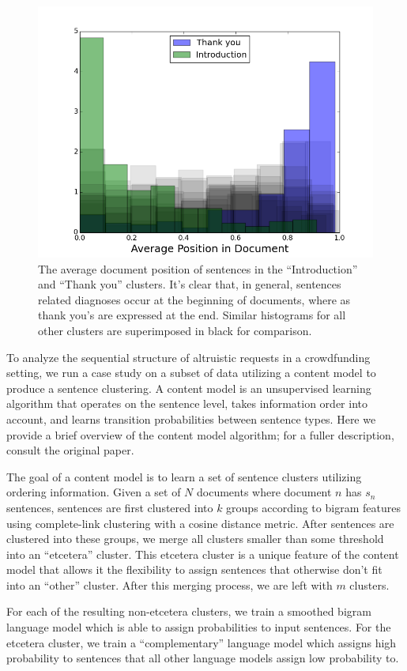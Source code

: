 \documentclass[letterpaper]{article}
\begin{document}
\begin{figure}
\centering
\includegraphics[width=.45\textwidth]{figures/docpos.png}
\caption{The average document position of sentences in the ``Introduction'' and ``Thank you'' clusters. It's clear that, in general, sentences related diagnoses occur at the beginning of documents, where as thank you's are expressed at the end. Similar histograms for all other clusters are superimposed in black for comparison.}
\label{fig:docpos}
\end{figure}

To analyze the sequential structure of altruistic requests in a crowdfunding setting, we run a case study on a subset of data utilizing a content model \cite{barzilay2004catching} to produce a sentence clustering. A content model is an unsupervised learning algorithm that operates on the sentence level, takes information order into account, and learns transition probabilities between sentence types. Here we provide a brief overview of the content model algorithm; for a fuller description, consult the original paper.

The goal of a content model is to learn a set of sentence clusters utilizing ordering information. Given a set of $N$ documents where document $n$ has $s_n$ sentences, sentences are first clustered into $k$ groups according to bigram features using complete-link clustering with a cosine distance metric. After sentences are clustered into these groups, we merge all clusters smaller than some threshold into an ``etcetera'' cluster. This etcetera cluster is a unique feature of the content model that allows it the flexibility to assign sentences that otherwise don't fit into an ``other'' cluster. After this merging process, we are left with $m$ clusters. 

For each of the resulting non-etcetera clusters, we train a smoothed bigram language model which is able to assign probabilities to input sentences. For the etcetera cluster, we train a ``complementary'' language model which assigns high probability to sentences that all other language models assign low probability to.
\end{document}
